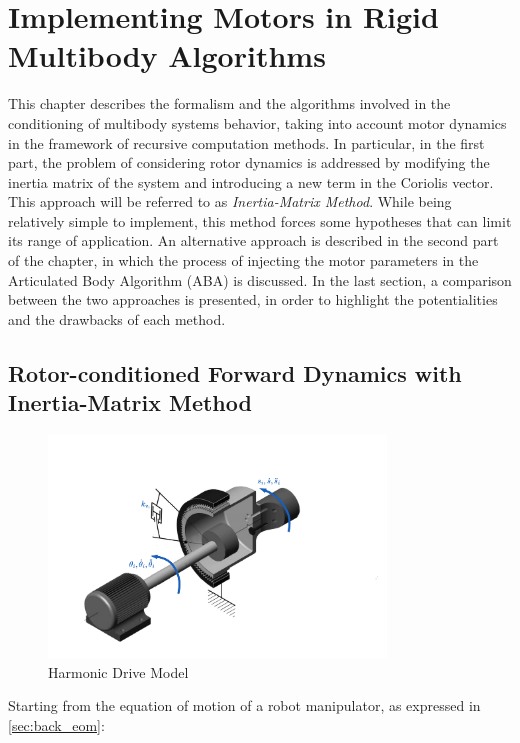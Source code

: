 \chapter{Implementing Motors in Rigid Multibody Algorithms}
\label{chp:contrib_ABA}

This chapter describes the formalism and the algorithms involved in the conditioning of multibody systems behavior, taking into account motor dynamics in the framework of recursive computation methods. In particular, in the first part, the problem of considering rotor dynamics is addressed by modifying the inertia matrix of the system and introducing a new term in the Coriolis vector. This approach will be referred to as \textit{Inertia-Matrix Method}. While being relatively simple to implement, this method forces some hypotheses that can limit its range of application. An alternative approach is described in the second part of the chapter, in which the process of injecting the motor parameters in the Articulated Body Algorithm (\ac{ABA}) is discussed. In the last section, a comparison between the two approaches is presented, in order to highlight the potentialities and the drawbacks of each method.

\section{Rotor-conditioned Forward Dynamics with Inertia-Matrix Method}

\begin{figure}
    \centering
    \caption{Harmonic Drive Model}
    \label{fig:harmonic_drive}
    \includegraphics[width=0.8\textwidth]{Images/harmonic_drive.png}
\end{figure}

Starting from the equation of motion of a robot manipulator, as expressed in \cref{sec:back_eom}:

